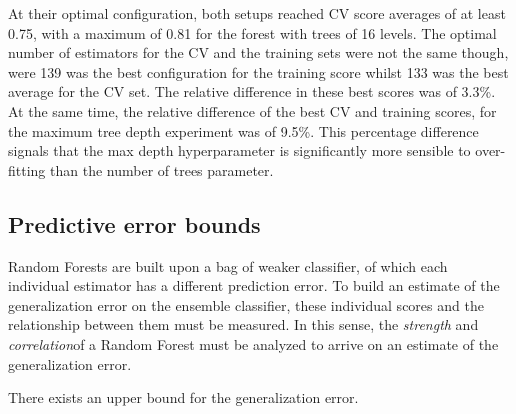 At their optimal configuration, both setups reached CV score averages of at least 0.75, with a maximum of 0.81 for the forest
with trees of 16 levels.
The optimal number of estimators for the CV and the training sets were not the same though, were 139 was the best configuration for the training score whilst 133 was the best average for the CV set. 
The relative difference in these best scores was of 3.3\%.
At the same time, the relative difference of the best CV and training scores, for the maximum tree depth experiment was of 9.5\%.
This percentage difference signals that the max depth hyperparameter is significantly more sensible to over-fitting than the number of trees parameter.


\subsection{Predictive error bounds}

Random Forests are built upon a bag of weaker classifier, of which each individual estimator has a different prediction error.
To build an estimate of the generalization error on the ensemble classifier, these individual scores and the relationship between them must be measured.
In this sense, the \textit{strength} and \textit{correlation}of a Random Forest must be analyzed to arrive on an estimate of the generalization error.


\begin{theorem}
There exists an upper bound for the generalization error.
\end{theorem}


